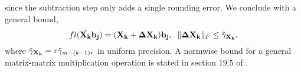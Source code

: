 since the subtraction step only adds a single rounding error. 
We conclude with a general bound, 
\begin{equation}\label{eqn:Xkbound}
	fl(\hat{\bb{X_k}}\bb{b_j}) = (\bb{X_k} + \bb{\Delta X_k})\bb{b_j}, \;\; \|\bb{\Delta X_k}\|_F \leq \tilde{\gamma}_{\bb{X_k}},
\end{equation}
where $\tilde{\gamma}_{\mathbf{X_k}} = r\tilde{\gamma}_{m-(k-1)r}$ in uniform precision.
A normwise bound for a general matrix-matrix multiplication operation is stated in section 19.5 of \cite{Higham2002}.

